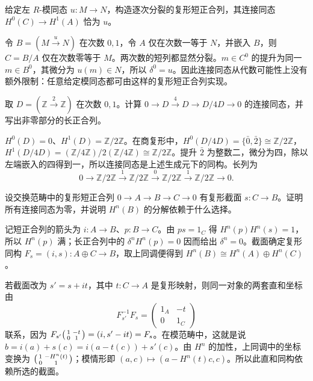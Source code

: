 \begin{exercise}\label{b4:ex:05-prescribed-connecting}
	给定左 \(R\)-模同态 \(u:M\to N\)，构造逐次分裂的复形短正合列，其连接同态 \(H^0(C)\to H^1(A)\) 恰为 \(u\)。
\end{exercise}
\begin{solution}
	令 \(B=(M\xrightarrow{u}N)\) 在次数 \(0,1\)，令 \(A\) 仅在次数一等于 \(N\)，并嵌入 \(B\)，则 \(C=B/A\) 仅在次数零等于 \(M\)。两次数的短列都显然分裂。\(m\in C^0\) 的提升为同一 \(m\in B^0\)，其微分为 \(u(m)\in N\)，所以 \(\delta^0=u\)。因此连接同态从代数可能性上没有额外限制：任意给定模同态都可由这样的复形短正合列实现。
\end{solution}

\begin{exercise}\label{b4:ex:05-modfour-connecting}
	取 \(D=(\mathbb Z\xrightarrow{2}\mathbb Z)\) 在次数 \(0,1\)。计算 \(0\to D\xrightarrow{4}D\to D/4D\to0\) 的连接同态，并写出非零部分的长正合列。
\end{exercise}
\begin{solution}
	\(H^0(D)=0\)、\(H^1(D)=\mathbb Z/2\mathbb Z\)。在商复形中，\(H^0(D/4D)=\{\bar0,\bar2\}\cong\mathbb Z/2\mathbb Z\)，\(H^1(D/4D)=(\mathbb Z/4\mathbb Z)/2(\mathbb Z/4\mathbb Z)\cong\mathbb Z/2\mathbb Z\)。提升 \(\bar2\) 为整数二，微分为四，除以左端嵌入的四得到一，所以连接同态是上述生成元下的同构。长列为
	\[
		0\to\mathbb Z/2\mathbb Z\xrightarrow{1}\mathbb Z/2\mathbb Z \xrightarrow{0}\mathbb Z/2\mathbb Z\xrightarrow{1}\mathbb Z/2\mathbb Z\to0.
	\]
\end{solution}

\begin{exercise}\label{b4:ex:05-split-complex-les}
	设交换范畴中的复形短正合列 \(0\to A\to B\to C\to0\) 有复形截面 \(s:C\to B\)。证明所有连接同态为零，并说明 \(H^n(B)\) 的分解依赖于什么选择。
\end{exercise}
\begin{solution}
	记短正合列的箭头为 \(i:A\to B\)、\(p:B\to C\)。由 \(ps=1_C\) 得 \(H^n(p)H^n(s)=1\)，所以 \(H^n(p)\) 满；长正合列中的 \(\delta^nH^n(p)=0\) 因而给出 \(\delta^n=0\)。截面确定复形同构 \(F_s=(i,s):A\oplus C\to B\)，取上同调便得到 \(H^n(B)\cong H^n(A)\oplus H^n(C)\)。

	若截面改为 \(s'=s+it\)，其中 \(t:C\to A\) 是复形映射，则同一对象的两套直和坐标由
	\[
		F_{s'}^{-1}F_s=
		\begin{pmatrix}1_A&-t\\0&1_C\end{pmatrix}
	\]
	联系，因为 \(F_{s'}\begin{psmallmatrix}1&-t\\0&1\end{psmallmatrix}=(i,s'-it)=F_s\)。在模范畴中，这就是说 \(b=i(a)+s(c)=i(a-t(c))+s'(c)\)。由 \(H^n\) 的加性，上同调中的坐标变换为 \(\begin{psmallmatrix}1&-H^n(t)\\0&1\end{psmallmatrix}\)；模情形即 \((a,c)\mapsto(a-H^n(t)c,c)\)。所以此直和同构依赖所选的截面。
\end{solution}

